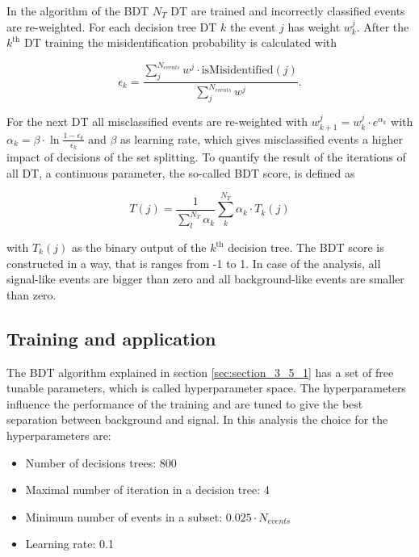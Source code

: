 In the algorithm of the \gls{BDT} $N_{T}$ \gls{DT} are trained and incorrectly classified events are re-weighted. For each decision tree \gls{DT} $k$ the event $j$ has weight $w^{j}_{k}$. After the $k^{\text{th}}$ \gls{DT} training the misidentification probability is calculated with

\begin{equation}
	\epsilon_{k} = \frac{\sum_{j}^{N_{events}} w^{j} \cdot \text{isMisidentified}(j)}{\sum_{j}^{N_{events}} w^{j}}.
\end{equation}

For the next \gls{DT} all misclassified events are re-weighted with $w^{j}_{k+1} = w^{j}_{k} \cdot e^{\alpha_{k}}$ with $\alpha_{k} = \beta \cdot \ln{\frac{1-\epsilon_{k}}{\epsilon_{k}}}$ and $\beta$ as learning rate, which gives misclassified events a higher impact of decisions of the set splitting. To quantify the result of the iterations of all \gls{DT}, a continuous parameter, the so-called BDT score, is defined as 

\begin{equation}
	\label{eq:eq_3_12}
	T(j) = \frac{1}{\sum_l^{N_T} \alpha_k} \sum_k^{N_T} \alpha_k \cdot T_k(j)
\end{equation}

with $T_k(j)$ as the binary output of the $k^{\text{th}}$  decision tree. The BDT score is constructed in a way, that is ranges from -1 to 1. In case of the analysis, all signal-like events are bigger than zero and all background-like events are smaller than zero. 


\subsection{Training and application}
\label{sec:section_3_5_2}

The \gls{BDT} algorithm explained in section \ref{sec:section_3_5_1} has a set of free tunable parameters, which is called hyperparameter space. The hyperparameters influence the performance of the training and are tuned to give the best separation between background and signal. In this analysis the choice for the hyperparameters are:

\begin{itemize}
	\item Number of decisions trees: 800
	\item Maximal number of iteration in a decision tree: 4
	\item Minimum number of events in a subset: $0.025 \cdot N_{events}$
	\item Learning rate: 0.1
\end{itemize}

